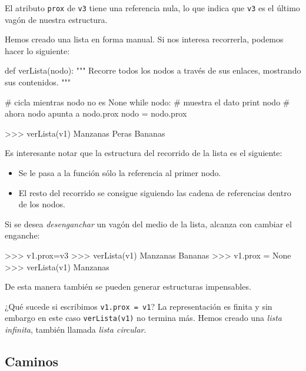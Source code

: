 El atributo \lstinline!prox! de \lstinline!v3! tiene una referencia nula,
lo que indica que \lstinline!v3! es el último vagón de nuestra estructura.

Hemos creado una lista en forma manual. Si nos interesa recorrerla, podemos
hacer lo siguiente:

\begin{codigo-python-sn}
def verLista(nodo):
    """ Recorre todos los nodos a través de sus enlaces,
        mostrando sus contenidos. """

    # cicla mientras nodo no es None
    while nodo:
        # muestra el dato
        print nodo
        # ahora nodo apunta a nodo.prox
        nodo = nodo.prox
\end{codigo-python-sn}

\begin{codigo-python-sn}
>>> verLista(v1)
Manzanas
Peras
Bananas
\end{codigo-python-sn}

Es interesante notar que la estructura del recorrido de la lista es el
siguiente:

\begin{itemize}
\item Se le pasa a la función sólo la referencia al primer nodo.

\item El resto del recorrido se consigue siguiendo las cadena de
referencias dentro de los nodos.
\end{itemize}

Si se desea {\it desenganchar} un vagón del medio de la lista, alcanza con
cambiar el enganche:

\begin{codigo-python-sn}
>>> v1.prox=v3
>>> verLista(v1)
Manzanas
Bananas
>>> v1.prox = None
>>> verLista(v1)
Manzanas
\end{codigo-python-sn}

De esta manera también se pueden generar estructuras impensables.

¿Qué sucede si escribimos \lstinline!v1.prox = v1!? La representación es finita
y sin embargo en este caso \lstinline!verLista(v1)!  no termina más. Hemos
creado una {\it lista infinita}, también llamada {\it lista circular}.


\subsection{Caminos}


